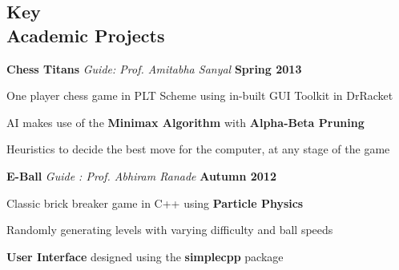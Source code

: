 \documentclass[margin,11pt]{resume}
\begin{document}
\begin{resume}
    \section{\mysidestyle Key \\ Academic Projects}
    \textbf{Chess Titans}  \hspace{5em} \textsl{Guide: Prof. Amitabha Sanyal} \hspace{8em} \textbf{Spring 2013}
\vspace{-3.5mm}
\begin{list2}
\item One player chess game in PLT Scheme using in-built GUI Toolkit in DrRacket 
\item AI makes use of the \textbf{Minimax Algorithm} with \textbf{Alpha-Beta Pruning}
\item Heuristics to decide the best move for the computer, at any stage of the game
\end{list2}
\vspace{-2mm}
\textbf{E-Ball}  \hspace{8em} \textsl{Guide : Prof. Abhiram Ranade} \hspace{7em} \textbf{Autumn 2012}
\vspace{-3.5mm}
\begin{list2}
\item Classic brick breaker game in C++ using \textbf{Particle Physics} 
\item Randomly generating levels with varying difficulty and ball speeds 
\item \textbf{User Interface} designed using the \textbf{simplecpp} package
\end{list2}


\end{resume}
\end{document}
